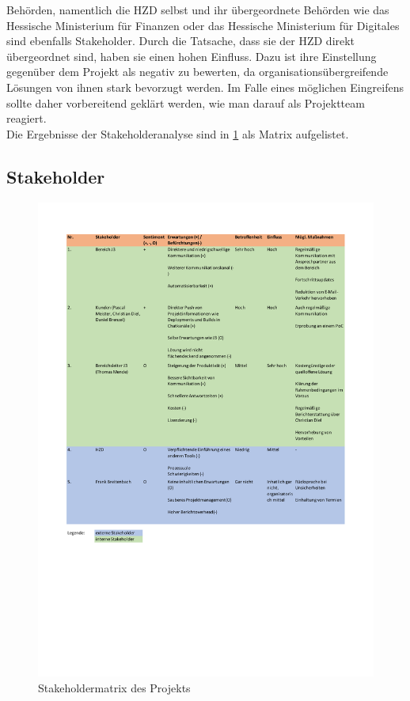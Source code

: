 \documentclass[ThesisDJ.tex]{subfiles}
\begin{document}
  Behörden, namentlich die HZD selbst und ihr übergeordnete Behörden wie das Hessische Ministerium für Finanzen oder das Hessische Ministerium 
  für Digitales sind ebenfalls Stakeholder. Durch die Tatsache, dass sie der HZD direkt übergeordnet sind, haben sie einen hohen Einfluss. Dazu 
  ist ihre Einstellung gegenüber dem Projekt als negativ zu bewerten, da organisationsübergreifende Lösungen von ihnen stark bevorzugt werden.
  Im Falle eines möglichen Eingreifens sollte daher vorbereitend geklärt werden, wie man darauf als Projektteam reagiert. \\

  Die Ergebnisse der Stakeholderanalyse sind in \ref{fig:stakeholders} als Matrix aufgelistet.

  \subsection{Stakeholder}
    \begin{figure}[h!]
      \includegraphics[width=\textwidth]{Stakeholdermatrix.pdf}
      \centering
      \caption{Stakeholdermatrix des Projekts}
      \label{fig:stakeholders}
    \end{figure}
\end{document}
